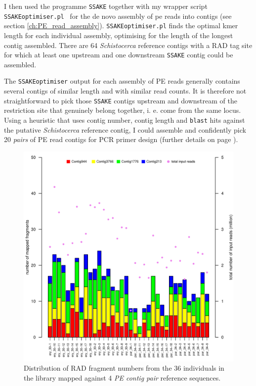 \documentclass[a4paper,12pt,times,print,index,custombib,custommargin]{PhDThesisPSnPDF}\usepackage[]{graphicx}\usepackage[]{color}
\newenvironment{knitrout}{}{} %
\begin{document}
I then used the programme \texttt{SSAKE} \citep{Warren2007} together with my wrapper script \texttt{SSAKEoptimiser.pl}~ for the de novo assembly of \gls{pe} reads into contigs (see section \ref{ch:PE_read_assembly}). \texttt{SSAKEoptimiser.pl} finds the optimal \gls{kmer} length for each individual assembly, optimising for the length of the longest contig assembled. There are 64 \textit{Schistocerca} reference contigs with a \gls{RAD tag} site for which at least one upstream and one downstream \texttt{SSAKE} contig could be assembled.

The \texttt{SSAKEoptimiser} output for each assembly of PE reads generally contains several \glspl{contig} of similar length and with similar read counts. It is therefore not straightforward to pick those \texttt{SSAKE} contigs upstream and downstream of the restriction site that genuinely belong together, i. e. come from the same locus. Using a heuristic that uses contig number, contig length and \texttt{blast} hits against the putative \textit{Schistocerca} reference contig, I could assemble and confidently pick 20 \emph{pairs} of PE read contigs for PCR primer design (further details on page \pageref{ch:picking_right_contig}). 
%
\begin{figure}
\begin{knitrout}
\color{fgcolor}

{\centering \includegraphics[width=.9\linewidth]{figure/fragments_mapped_per_ind-1} 

}



\end{knitrout}
\caption{Distribution of RAD \gls{fragment} numbers from the 36 individuals in the library mapped against 4 \emph{PE contig pair} reference sequences.}
\label{fragments-mapped-per-ind}
\end{figure}
%
\end{document}
